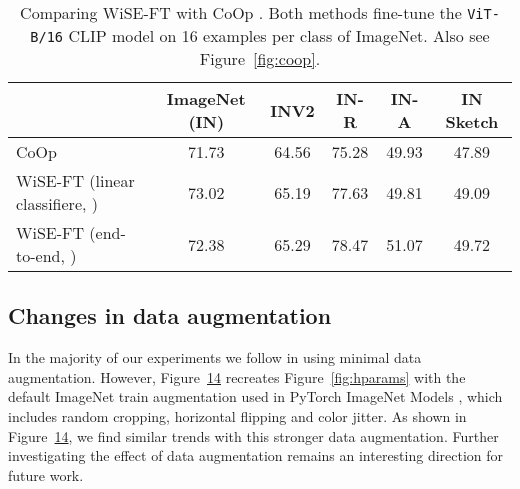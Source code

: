 \begin{table*}[]
    \centering
\begin{tabular}{lccccc}
\toprule
{} &  ImageNet (IN) &  INV2 &  IN-R &  IN-A &  IN Sketch \\
\midrule
CoOp \cite{coop} &     71.73 &       64.56 &       75.28 &       49.93 &            47.89 \\
WiSE-FT (linear classifiere, )   &     73.02 &       65.19 &       77.63 &       49.81 &            49.09 \\
WiSE-FT (end-to-end, )  &     72.38 &       65.29 &       78.47 &       51.07 &            49.72 \\
\bottomrule
\end{tabular}
    \caption{Comparing WiSE-FT with CoOp \cite{coop}. Both methods fine-tune the \texttt{ViT-B/16} CLIP model on 16 examples per class of ImageNet. Also see Figure~\ref{fig:coop}.}
    \label{tab:coop}
\end{table*}

\subsection{Changes in data augmentation}\label{sec:dataaug}

In the majority of our experiments we follow \citet{radford2021learning} in using minimal data augmentation. However,
Figure~\hyperlink{fig:hparamsaug}{14} recreates Figure~\ref{fig:hparams} with the default ImageNet train augmentation used in PyTorch ImageNet Models \cite{rw2019timm}, which includes random cropping, horizontal flipping and color jitter. As shown in Figure~\hyperlink{fig:hparamsaug}{14}, we find similar trends with this stronger data augmentation. Further investigating the effect of data augmentation remains an interesting direction for future work.

\begin{figure*}
\captionlistentry{}
\hypertarget{fig:hparamsaug}{}
\end{figure*}

